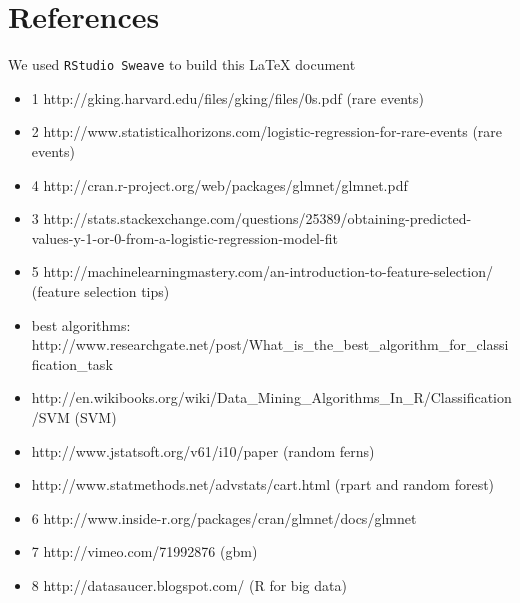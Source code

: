 \documentclass[a4paper]{article}
\begin{document}
\section*{References}
We used \texttt{RStudio Sweave} to build this \LaTeX{} document
\begin{itemize}
  \item 1 http://gking.harvard.edu/files/gking/files/0s.pdf (rare events)
  \item 2 http://www.statisticalhorizons.com/logistic-regression-for-rare-events (rare events)
  \item 4 http://cran.r-project.org/web/packages/glmnet/glmnet.pdf
  \item 3 http://stats.stackexchange.com/questions/25389/obtaining-predicted-values-y-1-or-0-from-a-logistic-regression-model-fit
  \item 5 http://machinelearningmastery.com/an-introduction-to-feature-selection/ (feature selection tips)
  \item best algorithms: http://www.researchgate.net/post/What\_is\_the\_best\_algorithm\_for\_classification\_task
  \item http://en.wikibooks.org/wiki/Data\_Mining\_Algorithms\_In\_R/Classification/SVM (SVM)
  \item http://www.jstatsoft.org/v61/i10/paper (random ferns)
  \item http://www.statmethods.net/advstats/cart.html (rpart and random forest)
  \item 6 http://www.inside-r.org/packages/cran/glmnet/docs/glmnet
  \item 7 http://vimeo.com/71992876 (gbm)
  \item 8 http://datasaucer.blogspot.com/ (R for big data)
\end{itemize}
\end{document}
